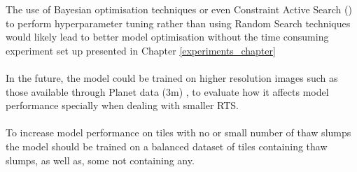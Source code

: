 The use of Bayesian optimisation techniques or even Constraint Active Search (\cite{pmlr-v139-malkomes21a}) to perform hyperparameter tuning rather than using Random Search techniques would likely lead to better model optimisation without the time consuming experiment set up presented in Chapter \ref{experiments_chapter}
\paragraph{}
In the future, the model could be trained on higher resolution images such as those available through Planet data (3m) , to evaluate how it affects model performance specially when dealing with smaller RTS.
\paragraph{}
To increase model performance on tiles with no or small number of thaw slumps the model should be trained on a balanced dataset of tiles containing thaw slumps, as well as, some not containing any.